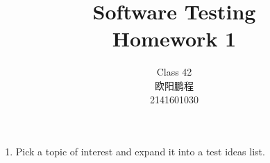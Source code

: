 \documentclass{article}
\title{Software Testing \\ Homework 1}
\author{Class 42 \\ 欧阳鹏程 \\ 2141601030}
\begin{document}
\maketitle
\begin{enumerate}
	\item Pick a topic of interest and expand it into a test ideas list.
	
\end{enumerate}
\end{document}
